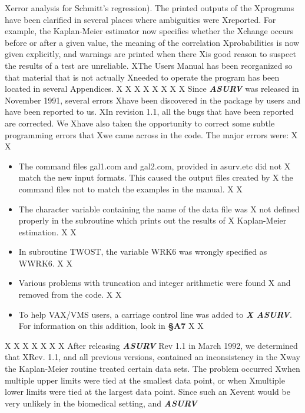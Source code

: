 Xerror analysis for Schmitt's regression).  The printed outputs of the
Xprograms have been clarified in several places where ambiguities were
Xreported.  For example, the Kaplan-Meier estimator now specifies whether the
Xchange occurs before or after a given value, the meaning of the correlation
Xprobabilities is now given explicitly, and warnings are printed when there
Xis good reason to suspect the results of a test are unreliable.  
XThe Users Manual has been reorganized so that material that is not actually 
Xneeded to operate the program has been located in several Appendices.  
X
X\bigskip
X 
X\bigskip
X
X
X
X     Since {\sl\bf ASURV} was released in November 1991, several errors
Xhave been discovered in the package by users and have been reported to us.
XIn revision 1.1, all the bugs that have been reported are corrected.  We
Xhave also taken the opportunity to correct some subtle programming errors that
Xwe came across in the code.  The major errors were:
X
X\begin{itemize}
X
X  \item The command files gal1.com and gal2.com, provided in asurv.etc did not
X        match the new input formats.  This caused the output files created by
X        the command files not to match the examples in the manual.
X
X  \item The character variable containing the name of the data file was
X        not defined properly in the subroutine which prints out the results of
X        Kaplan-Meier estimation.
X
X  \item In subroutine TWOST, the variable WRK6 was wrongly specified as WWRK6.
X
X  \item Various problems with truncation and integer arithmetic were found
X        and removed from the code.
X
X  \item To help VAX/VMS users, a carriage control line was added to {\sl\bf 
X        ASURV}.  For information on this addition, look in {\bf \S A7}
X
X\end{itemize}
X
X
X\bigskip
X
X
X
X     After releasing {\sl\bf ASURV} Rev 1.1 in March 1992, we determined that
XRev. 1.1, and all previous versions, contained an inconsistency in the
Xway the Kaplan-Meier routine treated certain data sets.  The problem occurred 
Xwhen multiple upper limits were tied at the smallest data point, or when
Xmultiple lower limits were tied at the largest data point.  Since such an 
Xevent would be very unlikely in the biomedical setting, and {\sl\bf ASURV}
